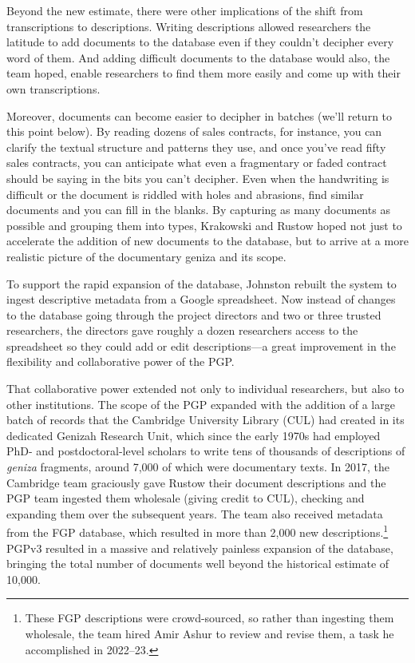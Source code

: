 \documentclass{article}
\begin{document}
Beyond the new estimate, there were other implications of the shift from transcriptions to descriptions. Writing descriptions allowed researchers the latitude to add documents to the database even if they couldn’t decipher every word of them. And adding difficult documents to the database would also, the team hoped, enable researchers to find them more easily and come up with their own transcriptions. 

Moreover, documents can become easier to decipher in batches (we’ll return to this point below). By reading dozens of sales contracts, for instance, you can clarify the textual structure and patterns they use, and once you’ve read fifty sales contracts, you can anticipate what even a fragmentary or faded contract should be saying in the bits you can’t decipher. Even when the handwriting is difficult or the document is riddled with holes and abrasions, find similar documents and you can fill in the blanks. By capturing as many documents as possible and grouping them into types, Krakowski and Rustow hoped not just to accelerate the addition of new documents to the database, but to arrive at a more realistic picture of the documentary geniza and its scope.

To support the rapid expansion of the database, Johnston rebuilt the system to ingest descriptive metadata from a Google spreadsheet. Now instead of changes to the database going through the project directors and two or three trusted researchers, the directors gave roughly a dozen researchers access to the spreadsheet so they could add or edit descriptions—a great improvement in the flexibility and collaborative power of the PGP. 

That collaborative power extended not only to individual researchers, but also to other institutions. The scope of the PGP expanded with the addition of a large batch of records that the Cambridge University Library (CUL) had created in its dedicated Genizah Research Unit, which since the early 1970s had employed PhD- and postdoctoral-level scholars to write tens of thousands of descriptions of \textit{geniza} fragments, around 7,000 of which were documentary texts. In 2017, the Cambridge team graciously gave Rustow their document descriptions and the PGP team ingested them wholesale (giving credit to CUL), checking and expanding them over the subsequent years. The team also received metadata from the FGP database, which resulted in more than 2,000 new descriptions.\footnote{These FGP descriptions were crowd-sourced, so rather than ingesting them wholesale, the team hired Amir Ashur to review and revise them, a task he accomplished in 2022–23.
} PGPv3 resulted in a massive and relatively painless expansion of the database, bringing the total number of documents well beyond the historical estimate of 10,000. 
\end{document}
